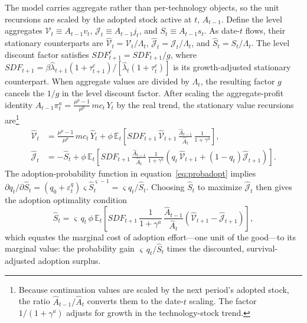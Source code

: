 \documentclass[a4paper,11pt]{article}
\begin{document}
The model carries aggregate rather than per-technology objects, so the unit recursions are scaled by the adopted stock active at $t$, $A_{t-1}$.
Define the level aggregates $\mathcal{V}_t \equiv A_{t-1}v_t$, $\mathcal{J}_t \equiv A_{t-1}j_t$, and $S_t \equiv A_{t-1}s_t$.
As date-$t$ flows, their stationary counterparts are $\hat{\mathcal{V}}_t=\mathcal{V}_t/\Lambda_t$, $\hat{\mathcal{J}}_t=\mathcal{J}_t/\Lambda_t$, and $\hat{S}_t=S_t/\Lambda_t$.
The level discount factor satisfies $\mathit{SDF}^{\ell}_{t+1}=\mathit{SDF}_{t+1}/g$, where $\mathit{SDF}_{t+1}=\beta\hat\lambda_{t+1}(1+\tau_{t+1}^c)/[\hat\lambda_t(1+\tau_t^c)]$ is its growth-adjusted stationary counterpart.
When aggregate values are divided by $\Lambda_t$, the resulting factor $g$ cancels the $1/g$ in the level discount factor.
After scaling the aggregate-profit identity $A_{t-1}\pi_t^{a} = \frac{\mu^{p}-1}{\mu^{p}}\, mc_t\, Y_t$ by the real trend, the stationary value recursions are\footnote{Because continuation values are scaled by the next period's adopted stock, the ratio $\hat{A}_{t-1}/\hat{A}_t$ converts them to the date-$t$ scaling.
The factor $1/(1+\gamma^{a})$ adjusts for growth in the technology-stock trend.}
\begin{align}
    \hat{\mathcal{V}}_t &= \frac{\mu^{p}-1}{\mu^{p}}\, mc_t\, \hat{Y}_t + \phi\, \mathbb{E}_t\!\left[\mathit{SDF}_{t+1}\, \hat{\mathcal{V}}_{t+1}\, \frac{\hat{A}_{t-1}}{\hat{A}_{t}}\, \frac{1}{1+\gamma^{a}}\right], \label{eq:VA}\\
    \hat{\mathcal{J}}_t &= -\hat{S}_t + \phi\, \mathbb{E}_t\!\left[\mathit{SDF}_{t+1}\, \frac{\hat{A}_{t-1}}{\hat{A}_{t}}\, \frac{1}{1+\gamma^{a}}\left(q_t\, \hat{\mathcal{V}}_{t+1} + \left(1-q_t\right)\hat{\mathcal{J}}_{t+1}\right)\right]. \label{eq:JZ}
\end{align}
The adoption-probability function in equation~\eqref{eq:probadopt} implies $\partial q_t/\partial \hat{S}_t = \left(q_0+\varepsilon_t^{q}\right)\varsigma \hat{S}_t^{\varsigma-1} = \varsigma q_t/\hat{S}_t$.
Choosing $\hat{S}_t$ to maximize $\hat{\mathcal{J}}_t$ then gives the adoption optimality condition
\begin{equation}
    \hat{S}_t = \varsigma\, q_t\, \phi\, \mathbb{E}_t\!\left[\mathit{SDF}_{t+1}\, \frac{1}{1+\gamma^{a}}\, \frac{\hat{A}_{t-1}}{\hat{A}_{t}}\left(\hat{\mathcal{V}}_{t+1} - \hat{\mathcal{J}}_{t+1}\right)\right], \label{eq:SAfoc}
\end{equation}
which equates the marginal cost of adoption effort---one unit of the good---to its marginal value: the probability gain $\varsigma\, q_t/\hat{S}_t$ times the discounted, survival-adjusted adoption surplus.
\end{document}
